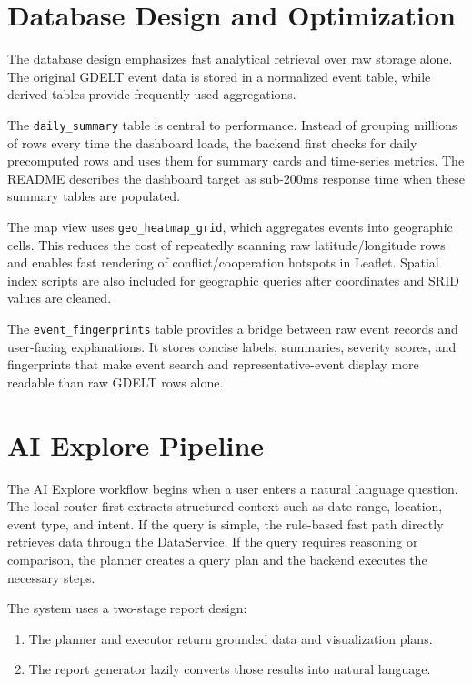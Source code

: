 \documentclass[11pt]{article}
\begin{document}
\section{Database Design and Optimization}

The database design emphasizes fast analytical retrieval over raw storage alone. The original GDELT event data is stored in a normalized event table, while derived tables provide frequently used aggregations.

The \texttt{daily\_summary} table is central to performance. Instead of grouping millions of rows every time the dashboard loads, the backend first checks for daily precomputed rows and uses them for summary cards and time-series metrics. The README describes the dashboard target as sub-200ms response time when these summary tables are populated.

The map view uses \texttt{geo\_heatmap\_grid}, which aggregates events into geographic cells. This reduces the cost of repeatedly scanning raw latitude/longitude rows and enables fast rendering of conflict/cooperation hotspots in Leaflet. Spatial index scripts are also included for geographic queries after coordinates and SRID values are cleaned.

The \texttt{event\_fingerprints} table provides a bridge between raw event records and user-facing explanations. It stores concise labels, summaries, severity scores, and fingerprints that make event search and representative-event display more readable than raw GDELT rows alone.

\section{AI Explore Pipeline}

The AI Explore workflow begins when a user enters a natural language question. The local router first extracts structured context such as date range, location, event type, and intent. If the query is simple, the rule-based fast path directly retrieves data through the DataService. If the query requires reasoning or comparison, the planner creates a query plan and the backend executes the necessary steps.

The system uses a two-stage report design:

\begin{enumerate}
    \item The planner and executor return grounded data and visualization plans.
    \item The report generator lazily converts those results into natural language.
\end{enumerate}
\end{document}
